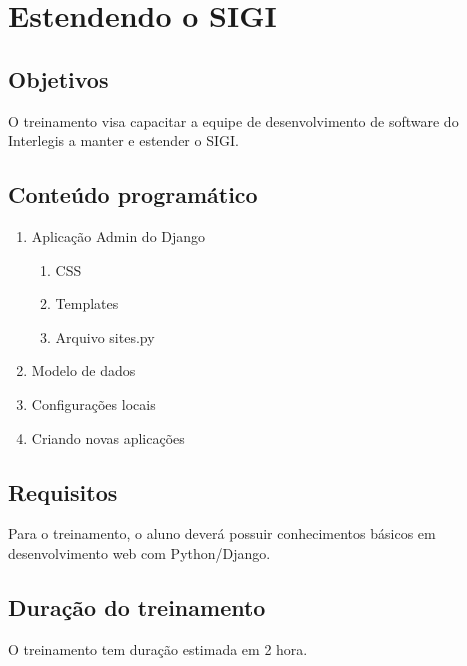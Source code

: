 %
%

\section{Estendendo o SIGI}
\label{sec:sigidev}

\subsection{Objetivos}
O treinamento visa capacitar a equipe de desenvolvimento de software
do Interlegis a manter e estender o SIGI.

\subsection{Conteúdo programático}
\begin{enumerate}
\item Aplicação Admin do Django
  \begin{enumerate}
  \item CSS
  \item Templates
  \item Arquivo sites.py
  \end{enumerate}
\item Modelo de dados
\item Configurações locais
\item Criando novas aplicações
\end{enumerate}

\subsection{Requisitos}
Para o treinamento, o aluno deverá possuir conhecimentos básicos em
desenvolvimento web com Python/Django.

\subsection{Duração do treinamento}
O treinamento tem duração estimada em 2 hora.

%
%
